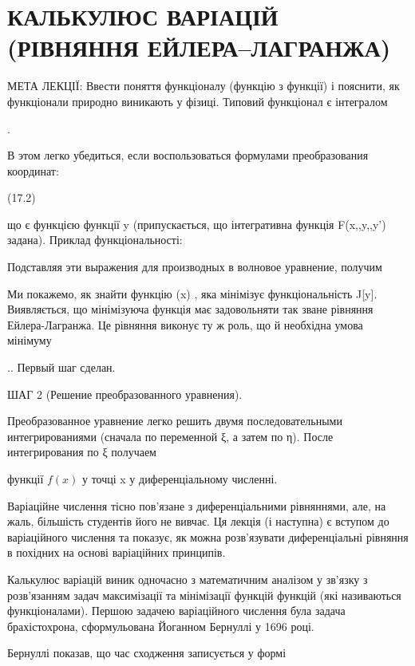 \documentclass[
  ukrainian,
]{article}
\begin{document}
\section{КАЛЬКУЛЮС ВАРІАЦІЙ (РІВНЯННЯ
ЕЙЛЕРА--ЛАГРАНЖА)}\label{ux43aux430ux43bux44cux43aux443ux43bux44eux441-ux432ux430ux440ux456ux430ux446ux456ux439-ux440ux456ux432ux43dux44fux43dux43dux44f-ux435ux439ux43bux435ux440ux430ux43bux430ux433ux440ux430ux43dux436ux430}

МЕТА ЛЕКЦІЇ: Ввести поняття функціоналу (функцію з функції) і пояснити,
як функціонали природно виникають у фізиці. Типовий функціонал є
інтегралом

.

В этом легко убедиться, если воспользоваться формулами преобразования
координат:

(17.2)

що є функцією функції y (припускається, що інтегративна функція
F\left(x,,y,,y'\right) задана). Приклад функціональності:

Подставляя эти выражения для производных в волновое уравнение, получим

Ми покажемо, як знайти функцію (x) , яка мінімізує
функціональність J{[}y{]}. Виявляється, що мінімізуюча функція має
 задовольняти так зване рівняння Ейлера-Лагранжа. Це
рівняння виконує ту ж роль, що й необхідна умова мінімуму

.. Первый шаг сделан.

ШАГ 2 (Решение преобразованного уравнения).

Преобразованное уравнение легко решить двумя последовательными
интегрированиями (сначала по переменной ξ, а затем по η). После
интегрирования по ξ получаем

функції \(f(x)\) у точці x у диференціальному численні.

Варіаційне числення тісно пов'язане з диференціальними рівняннями, але,
на жаль, більшість студентів його не вивчає. Ця лекція (і наступна) є
вступом до варіаційного числення та показує, як можна розв'язувати
диференціальні рівняння в похідних на основі варіаційних принципів.

Калькулюс варіацій виник одночасно з математичним аналізом у зв'язку з
розв'язанням задач максимізації та мінімізації функцій функцій (які
називаються функціоналами). Першою задачею варіаційного числення була
задача брахістохрона, сформульована Йоганном Бернуллі у 1696 році.

Бернуллі показав, що час сходження записується у формі
\end{document}
